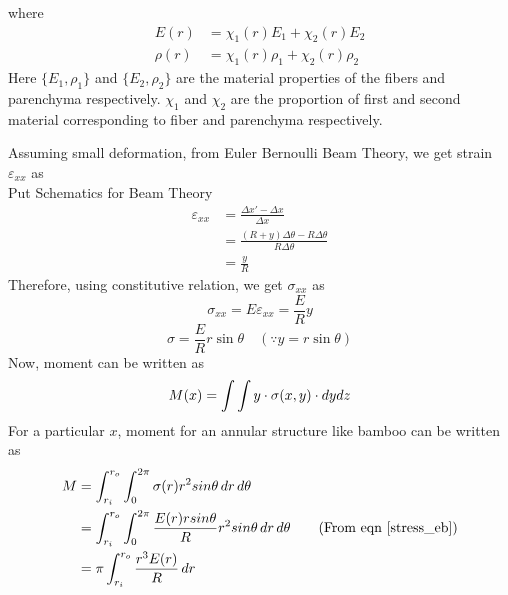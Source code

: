 \documentclass[10pt]{article}
\begin{document}
where 
\begin{equation}\label{objective_eb}
\begin{split}
E(r) &= \chi_1(r) E_1 + \chi_2(r) E_2\\
\rho(r) &= \chi_1(r) \rho_1 + \chi_2(r) \rho_2
\end{split}
\end{equation}
Here $\{E_1, \rho_1\}$ and $\{E_2, \rho_2\}$ are the material properties of the fibers and parenchyma respectively. $\chi_1$ and $\chi_2$ are the proportion of first and second material corresponding to fiber and parenchyma respectively.\par
Assuming small deformation, from Euler Bernoulli Beam Theory, we get strain $\varepsilon_{xx}$ as\\
Put Schematics for Beam Theory
\begin{equation}
\begin{split}
\varepsilon_{xx} &= \frac{\Delta x' - \Delta x}{\Delta x}\\
&= \frac{(R+y)\Delta\theta - R\Delta\theta}{R\Delta\theta}\\
&= \frac{y}{R}
\end{split}
\end{equation}
Therefore, using constitutive relation, we get $\sigma_{xx}$ as
\begin{equation}
\sigma_{xx} = E\varepsilon_{xx} = \frac{E}{R}y
\end{equation}
\begin{equation}\label{stress_eb}
\sigma = \frac{E}{R}r\sin\theta \quad (\because y = r\sin\theta)
\end{equation}Now, moment can be written as
\begin{equation}
M(x) = \int\int y\cdot\sigma(x,y)\cdot dydz\\
\end{equation}
For a particular $x$, moment for an annular structure like bamboo can be written as
\begin{equation}\label{moment_eb}
\begin{split}
M &= \int_{r_i}^{r_o}\int_0^{2\pi}\sigma(r)r^2 sin\theta\,dr\,d\theta &\\
&=\int_{r_i}^{r_o}\int_0^{2\pi} \frac{E(r)r sin\theta}{R}r^2 sin\theta\,dr\,d\theta &\quad (\text{From eqn }\eqref{stress_eb})\\
&=\pi\int_{r_i}^{r_o}\frac{r^3 E(r)}{R}\,dr
\end{split}
\end{equation}
\end{document}
